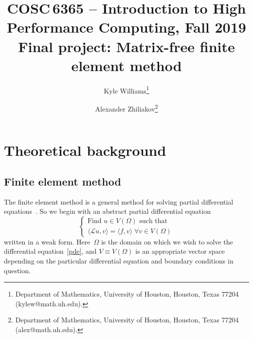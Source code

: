 \documentclass[12pt]{article}
\title{COSC\,6365 -- Introduction to High Performance Computing, Fall 2019\\Final project: \textbf{Matrix-free finite element method}}
\author{
	Kyle Williams\thanks{Department of Mathematics, University of Houston, Houston, Texas 77204 (kylew@math.uh.edu).} \and
	Alexander Zhiliakov\thanks{Department of Mathematics, University of Houston, Houston, Texas 77204 (alex@math.uh.edu).}
}
\begin{document}
	
\maketitle

\tableofcontents
\vfill
\clearpage
\let\oldtabular\tabular
\renewcommand{\tabular}[1][1.5]{\def\arraystretch{#1}\oldtabular}
\renewcommand\arraystretch{1.3}

\section{Theoretical background}

\subsection{Finite element method}\label{sec:fem}
The finite element method is a general method for solving partial differential equations~\cite{ciarlet2002finite}. So we begin with an abstract partial differential equation
\begin{equation}\label{pde}
\begin{cases} 
	\text{Find } u \in V(\Omega) \text{ such that } \\
	\langle \mathcal{L}u, v \rangle = \langle f, v \rangle \; \forall v \in V(\Omega)
\end{cases}
\end{equation}
written in a weak form. Here~$\Omega$ is the domain on which we wish to solve the differential equation~\eqref{pde}, and $V \equiv V(\Omega)$ is an appropriate vector space depending on the particular differential equation and boundary conditions in question. 
\end{document}
